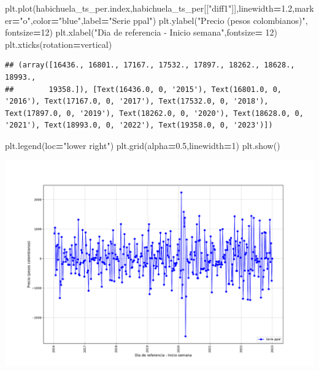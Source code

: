\documentclass[
]{book}
\newenvironment{Shaded}{\begin{snugshade}}{\end{snugshade}}
\newcommand{\DecValTok}[1]{\textcolor[rgb]{0.00,0.00,0.81}{#1}}
\newcommand{\FloatTok}[1]{\textcolor[rgb]{0.00,0.00,0.81}{#1}}
\newcommand{\NormalTok}[1]{#1}
\newcommand{\OperatorTok}[1]{\textcolor[rgb]{0.81,0.36,0.00}{\textbf{#1}}}
\newcommand{\StringTok}[1]{\textcolor[rgb]{0.31,0.60,0.02}{#1}}
\begin{document}
\begin{Shaded}
\begin{Highlighting}[]

\NormalTok{plt.plot(habichuela\_ts\_per.index,habichuela\_ts\_per[[}\StringTok{"diff1"}\NormalTok{]],linewidth}\OperatorTok{=}\FloatTok{1.2}\NormalTok{,marker}\OperatorTok{=}\StringTok{"o"}\NormalTok{,color}\OperatorTok{=}\StringTok{"blue"}\NormalTok{,label}\OperatorTok{=}\StringTok{"Serie ppal"}\NormalTok{)}
\NormalTok{plt.ylabel(}\StringTok{"Precio (pesos colombianos)"}\NormalTok{, fontsize}\OperatorTok{=}\DecValTok{12}\NormalTok{)}
\NormalTok{plt.xlabel(}\StringTok{"Dia de referencia {-} Inicio semana"}\NormalTok{,fontsize}\OperatorTok{=} \DecValTok{12}\NormalTok{)}
\NormalTok{plt.xticks(rotation}\OperatorTok{=}\StringTok{\textquotesingle{}vertical\textquotesingle{}}\NormalTok{)}
\end{Highlighting}
\end{Shaded}

\begin{verbatim}
## (array([16436., 16801., 17167., 17532., 17897., 18262., 18628., 18993.,
##        19358.]), [Text(16436.0, 0, '2015'), Text(16801.0, 0, '2016'), Text(17167.0, 0, '2017'), Text(17532.0, 0, '2018'), Text(17897.0, 0, '2019'), Text(18262.0, 0, '2020'), Text(18628.0, 0, '2021'), Text(18993.0, 0, '2022'), Text(19358.0, 0, '2023')])
\end{verbatim}

\begin{Shaded}
\begin{Highlighting}[]
\NormalTok{plt.legend(loc}\OperatorTok{=}\StringTok{"lower right"}\NormalTok{)}
\NormalTok{plt.grid(alpha}\OperatorTok{=}\FloatTok{0.5}\NormalTok{,linewidth}\OperatorTok{=}\DecValTok{1}\NormalTok{)}
\NormalTok{plt.show()}
\end{Highlighting}
\end{Shaded}

\includegraphics{bookdown-demo_files/figure-latex/unnamed-chunk-110-93.pdf}
\end{document}
